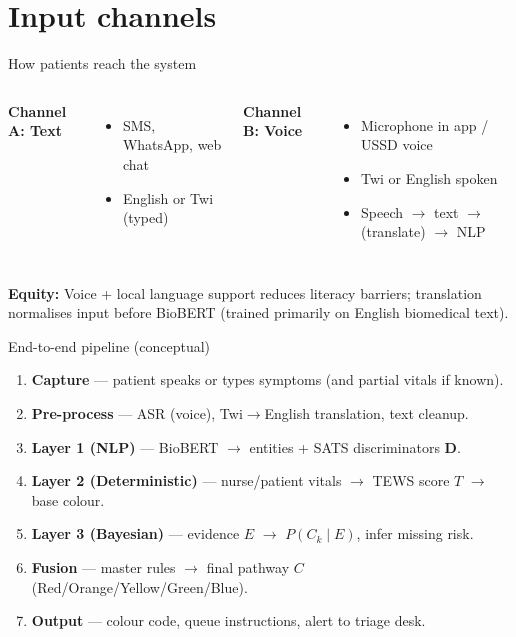 \documentclass[aspectratio=169,11pt]{beamer}
\begin{document}
\section{Input channels}

\begin{frame}{How patients reach the system}
	\begin{columns}[T]
		\textbf{Channel A: Text}
		\begin{itemize}
			\item SMS, WhatsApp, web chat
			\item English or Twi (typed)
		\end{itemize}

		\textbf{Channel B: Voice}
		\begin{itemize}
			\item Microphone in app / USSD voice
			\item Twi or English spoken
			\item Speech $\rightarrow$ text $\rightarrow$ (translate) $\rightarrow$ NLP
		\end{itemize}
	\end{columns}

	\vspace{0.5em}
	\textbf{Equity:} Voice + local language support reduces literacy barriers; translation normalises input before BioBERT (trained primarily on English biomedical text).
\end{frame}

\begin{frame}{End-to-end pipeline (conceptual)}
	\small
	\begin{enumerate}
		\item \textbf{Capture} --- patient speaks or types symptoms (and partial vitals if known).
		\item \textbf{Pre-process} --- ASR (voice), Twi$\rightarrow$English translation, text cleanup.
		\item \textbf{Layer 1 (NLP)} --- BioBERT $\rightarrow$ entities + SATS discriminators $\mathbf{D}$.
		\item \textbf{Layer 2 (Deterministic)} --- nurse/patient vitals $\rightarrow$ TEWS score $T$ $\rightarrow$ base colour.
		\item \textbf{Layer 3 (Bayesian)} --- evidence $E$ $\rightarrow$ $P(C_k \mid E)$, infer missing risk.
		\item \textbf{Fusion} --- master rules $\rightarrow$ final pathway $C$ (Red/Orange/Yellow/Green/Blue).
		\item \textbf{Output} --- colour code, queue instructions, alert to triage desk.
	\end{enumerate}
\end{frame}
\end{document}
